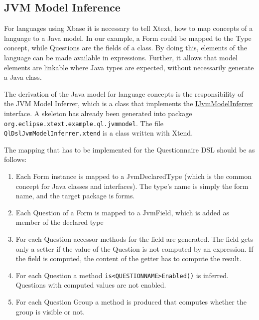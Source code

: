 \subsection{JVM Model Inference}

For languages using Xbase it is necessary to tell Xtext, how to map concepts of a language to a Java model. In our example,
a Form could be mapped to the Type concept, while Questions are the fields of a class. By doing this, elements of the language
can be made available in expressions. Further, it allows that model elements are linkable where Java types are expected, without
necessarily generate a Java class.

The derivation of the Java model for language concepts is the responsibility of the JVM Model Inferrer, which is a class that implements
the \href{http://download.eclipse.org/modeling/tmf/xtext/javadoc/2.3/org/eclipse/xtext/xbase/jvmmodel/IJvmModelInferrer.html}{IJvmModelInferrer} interface.
A skeleton has already been generated into package \texttt{org.eclipse.xtext.example.ql.jvmmodel}. The file \texttt{QlDslJvmModelInferrer.xtend} is a class
written with Xtend.

The mapping that has to be implemented for the Questionnaire DSL should be as follows:
\begin{enumerate}
  \item Each Form instance is mapped to a JvmDeclaredType (which is the common concept for Java classes and interfaces).
  The type's name is simply the form name, and the target package is forms.
  \item Each Question of a Form is mapped to a JvmField, which is added as member of the declared type
  \item For each Question accessor methods for the field are generated. The field gets only a setter if the value of the Question is
  not computed by an expression. If the field is computed, the content of the getter has to compute the result.
  \item For each Question a method \texttt{is<QUESTIONNAME>Enabled()} is inferred.
  Questions with computed values are not enabled.
  \item For each Question Group a method is produced that computes whether the
  group is visible or not. 
\end{enumerate}

